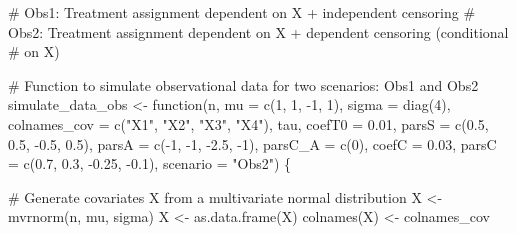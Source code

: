\documentclass[
  11pt,
  a4paper,
]{article}
\newenvironment{Shaded}{}{}
\newcommand{\AttributeTok}[1]{\textcolor[rgb]{0.84,0.23,0.29}{#1}}
\newcommand{\CommentTok}[1]{\textcolor[rgb]{0.42,0.45,0.49}{#1}}
\newcommand{\ControlFlowTok}[1]{\textcolor[rgb]{0.84,0.23,0.29}{#1}}
\newcommand{\DecValTok}[1]{\textcolor[rgb]{0.00,0.36,0.77}{#1}}
\newcommand{\FloatTok}[1]{\textcolor[rgb]{0.00,0.36,0.77}{#1}}
\newcommand{\FunctionTok}[1]{\textcolor[rgb]{0.44,0.26,0.76}{#1}}
\newcommand{\NormalTok}[1]{\textcolor[rgb]{0.14,0.16,0.18}{#1}}
\newcommand{\OtherTok}[1]{\textcolor[rgb]{0.44,0.26,0.76}{#1}}
\newcommand{\SpecialCharTok}[1]{\textcolor[rgb]{0.00,0.36,0.77}{#1}}
\newcommand{\StringTok}[1]{\textcolor[rgb]{0.01,0.18,0.38}{#1}}
\theoremstyle{plain}
\theoremstyle{plain}
\theoremstyle{plain}
\theoremstyle{definition}
\theoremstyle{remark}
\begin{document}
\begin{Shaded}
\begin{Highlighting}[]
\CommentTok{\# Obs1:  Treatment assignment dependent on X + independent censoring}
\CommentTok{\# Obs2:  Treatment assignment dependent on X + dependent censoring (conditional }
\CommentTok{\# on X)}

\CommentTok{\# Function to simulate observational data for two scenarios: Obs1 and Obs2}
\NormalTok{simulate\_data\_obs }\OtherTok{\textless{}{-}} \ControlFlowTok{function}\NormalTok{(n, }
                              \AttributeTok{mu =} \FunctionTok{c}\NormalTok{(}\DecValTok{1}\NormalTok{, }\DecValTok{1}\NormalTok{, }\SpecialCharTok{{-}}\DecValTok{1}\NormalTok{, }\DecValTok{1}\NormalTok{), }
                              \AttributeTok{sigma =} \FunctionTok{diag}\NormalTok{(}\DecValTok{4}\NormalTok{), }
                              \AttributeTok{colnames\_cov =} \FunctionTok{c}\NormalTok{(}\StringTok{"X1"}\NormalTok{, }\StringTok{"X2"}\NormalTok{, }\StringTok{"X3"}\NormalTok{, }\StringTok{"X4"}\NormalTok{),}
\NormalTok{                              tau,}
                              \AttributeTok{coefT0 =} \FloatTok{0.01}\NormalTok{, }
                              \AttributeTok{parsS =} \FunctionTok{c}\NormalTok{(}\FloatTok{0.5}\NormalTok{, }\FloatTok{0.5}\NormalTok{, }\SpecialCharTok{{-}}\FloatTok{0.5}\NormalTok{, }\FloatTok{0.5}\NormalTok{),}
                              \AttributeTok{parsA =} \FunctionTok{c}\NormalTok{(}\SpecialCharTok{{-}}\DecValTok{1}\NormalTok{, }\SpecialCharTok{{-}}\DecValTok{1}\NormalTok{, }\SpecialCharTok{{-}}\FloatTok{2.5}\NormalTok{, }\SpecialCharTok{{-}}\DecValTok{1}\NormalTok{), }
                              \AttributeTok{parsC\_A =} \FunctionTok{c}\NormalTok{(}\DecValTok{0}\NormalTok{), }
                              \AttributeTok{coefC =} \FloatTok{0.03}\NormalTok{,}
                              \AttributeTok{parsC =} \FunctionTok{c}\NormalTok{(}\FloatTok{0.7}\NormalTok{, }\FloatTok{0.3}\NormalTok{, }\SpecialCharTok{{-}}\FloatTok{0.25}\NormalTok{, }\SpecialCharTok{{-}}\FloatTok{0.1}\NormalTok{), }
                              \AttributeTok{scenario =} \StringTok{"Obs2"}\NormalTok{) \{}
  
  \CommentTok{\# Generate covariates X from a multivariate normal distribution}
\NormalTok{  X }\OtherTok{\textless{}{-}} \FunctionTok{mvrnorm}\NormalTok{(n, mu, sigma)}
\NormalTok{  X }\OtherTok{\textless{}{-}} \FunctionTok{as.data.frame}\NormalTok{(X)}
  \FunctionTok{colnames}\NormalTok{(X) }\OtherTok{\textless{}{-}}\NormalTok{ colnames\_cov}
  

\end{Highlighting}
\end{Shaded}
\end{document}
